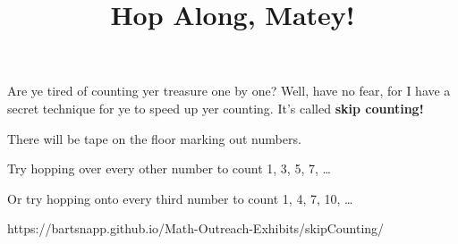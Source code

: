 \documentclass{../exhibit}
\title{Hop Along, Matey!}
\begin{document}
\begin{context}
Are ye tired of counting yer treasure one by one? Well, have no fear, for I have a secret technique for ye to speed up yer counting. It's called \textbf{skip counting!}
\end{context}

\begin{directions}
There will be tape on the floor marking out numbers.

Try hopping over every other number to count 1, 3, 5, 7, \ldots

Or try hopping onto every third number to count 1, 4, 7, 10, \ldots

\end{directions}

\begin{example}
\end{example}

\begin{mathConnections}
  https://bartsnapp.github.io/Math-Outreach-Exhibits/skipCounting/
\end{mathConnections}
\end{document}
